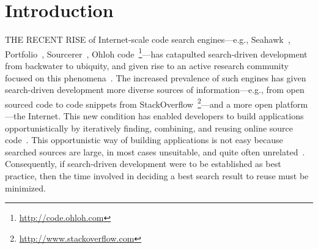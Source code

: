 \chapter{Introduction}{}
\label{sec:intro}


\lettrine[lraise=0.1, nindent=0em, slope=-.5em]{T}{HE RECENT RISE} of Internet-scale code search engines---e.g., Seahawk~\cite{Bacchelli:2012dl}, Portfolio~\cite{McMillan:2011wq}, Sourcerer~\cite{Bajracharya:2006vn}, Ohloh code~\footnote{\url{http://code.ohloh.com}}---has catapulted search-driven development from backwater to ubiquity, and given rise to an active research community focused on this phenomena~\cite{Bajracharya:2009fj, Bajracharya:2010iy, Bajracharya:2011kw}. The increased prevalence of such engines has given search-driven development more diverse sources of information---e.g., from open sourced code to code snippets from StackOverflow~\footnote{\url{http://www.stackoverflow.com}}---and a more open platform---the Internet. This new condition has enabled developers to build applications opportunistically by iteratively finding, combining, and reusing online source code~\cite{Brandt:2008wi, Ncube:2008fm, Brandt:2009jb, McMillan:2012dj}. This opportunistic way of building applications is not easy because searched sources are large, in most cases unsuitable, and quite often unrelated~\cite{GallardoValencia:2009gr}. Consequently, if search-driven development were to be established as best practice, then the time involved in deciding a best search result to reuse must be minimized.

